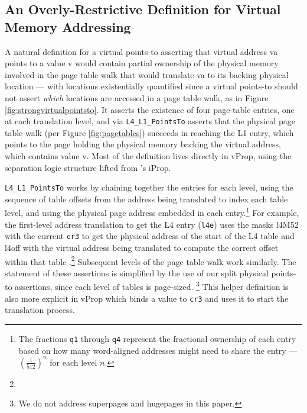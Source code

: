 \subsection{An Overly-Restrictive Definition for Virtual Memory Addressing}
\label{sec:overly-restrictive}
A natural definition for a virtual points-to
asserting that virtual address \textsf{va} points to a value \textsf{v}
would 
contain
partial ownership of the physical memory involved in the page table walk that would translate \textsf{va} to
its backing physical location --- with locations existentially quantified since a virtual points-to should not assert
\emph{which} locations are accessed in a page table walk, as in Figure \ref{fig:strongvirtualpointsto}.
It asserts the existence of four page-table entries, one at each translation level, and via \lstinline|L4_L1_PointsTo|
asserts that the physical page table walk (per Figure \ref{fig:pagetables}) succeeds in reaching the L1 entry,
which points to the page holding the physical memory backing the virtual address, which contains value \textsf{v}.
Most of the definition lives directly in \textsf{vProp}, using the separation logic structure lifted from \iris's \textsf{iProp}.

\lstinline|L4_L1_PointsTo| works by
chaining together the entries for each level, using the sequence of table offsets from the address being translated to index
each table level, and using the physical page address embedded in each entry.\footnote{
  The fractions \lstinline|q1| through \lstinline|q4| represent the fractional ownership of each entry based on how many
  word-aligned addresses might need to share the entry ---  $(\frac{1}{512})^n$ for each level $n$.
}
For example, the first-level address translation to get the L4 entry (\lstinline|l4e|) 
  uses the masks \textsf{l4M52} with the current \lstinline|cr3| to get the physical address of the start of the L4 table
  and \textsf{l4off} with the virtual address being translated to compute the correct  offset within that table .\footnote{}
  Subsequent levels of the page table walk  work similarly.
The statement of these assertions is simplified by the use of our split physical points-to assertions, since
each level of tables is page-sized. \footnote{We do not address superpages and hugepages in this paper.}
This helper definition is also more explicit in \textsf{vProp} which binds a value to \lstinline|cr3| and uses it to start the translation process.


